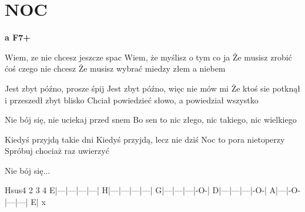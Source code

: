 \documentclass[../../../songbook.tex]{subfiles}
\begin{document}
\TabPositions{9cm} %
\section*{NOC}
{}
\vspace{0.5cm}
{\color{red}\textbf{a  F7+ } } \newline
                  
Wiem, ze nie chcesz jeszcze spac	  \newline 
Wiem, że myślisz o tym co ja   \newline
Że musisz zrobić ćoś czego nie chcesz	  \newline
Że musisz wybrać miedzy złem a niebem \newline
 
Jest zbyt późno, prosze śpij			 \newline
Jest zbyt późno, więc nie mów mi			 \newline
Że ktoś sie potknął i przeszedł zbyt blisko			 \newline
Chciał powiedzieć słowo, a powiedział wszystko			 \newline

\-\hspace{1cm} Nie bój się, nie uciekaj przed snem	 \newline 
\-\hspace{1cm} Bo sen to nic złego, nic takiego, nic wielkiego \newline 
      
Kiedyś przyjdą takie dni   \newline 
Kiedyś przyjdą, lecz nie dziś \newline 
Noc to pora nietoperzy \newline 
Spróbuj chociaż raz uwierzyć \newline 
    
\-\hspace{1cm} Nie bój się...   \newline 
      
       Hsus4    2   3   4 \newline
 E|---|---|---|---| \newline
 H|---|---|---|---| \newline
 G|---|---|---|-O-| \newline
 D|---|---|---|-O-| \newline
 A|---|-O-|---|---| \newline
 E|     x       
      
\end{document}
